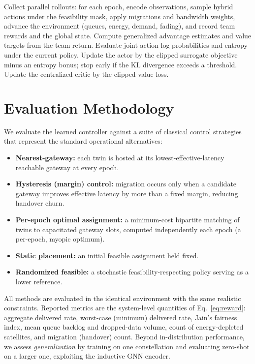 \documentclass[11pt]{article}
\begin{document}
\begin{algorithm}[t]
\caption{MAPPO training iteration (CTDE)}
\label{alg:mappo}
\begin{algorithmic}[1]
\State Collect parallel rollouts: for each epoch, encode observations, sample
hybrid actions under the feasibility mask, apply migrations and bandwidth weights,
advance the environment (queues, energy, demand, fading), and record team rewards
and the global state.
\State Compute generalized advantage estimates and value targets from the team
return.
  \State Evaluate joint action log-probabilities and entropy under the current
  policy.
  \State Update the actor by the clipped surrogate objective minus an entropy
  bonus; stop early if the KL divergence exceeds a threshold.
  \State Update the centralized critic by the clipped value loss.
\EndFor
\end{algorithmic}
\end{algorithm}

\section{Evaluation Methodology}
\label{sec:eval}

We evaluate the learned controller against a suite of classical control
strategies that represent the standard operational alternatives:
\begin{itemize}[leftmargin=*]
  \item \textbf{Nearest-gateway:} each twin is hosted at its lowest-effective-latency
  reachable gateway at every epoch.
  \item \textbf{Hysteresis (margin) control:} migration occurs only when a
  candidate gateway improves effective latency by more than a fixed margin,
  reducing handover churn.
  \item \textbf{Per-epoch optimal assignment:} a minimum-cost bipartite matching of
  twins to capacitated gateway slots, computed independently each epoch (a
  per-epoch, myopic optimum).
  \item \textbf{Static placement:} an initial feasible assignment held fixed.
  \item \textbf{Randomized feasible:} a stochastic feasibility-respecting policy
  serving as a lower reference.
\end{itemize}

All methods are evaluated in the identical environment with the same realistic
constraints. Reported metrics are the system-level quantities of
Eq.~\eqref{eq:reward}: aggregate delivered rate, worst-case (minimum) delivered
rate, Jain's fairness index, mean queue backlog and dropped-data volume, count of
energy-depleted satellites, and migration (handover) count. Beyond in-distribution
performance, we assess \emph{generalization} by training on one constellation and
evaluating zero-shot on a larger one, exploiting the inductive GNN encoder.
\end{document}
